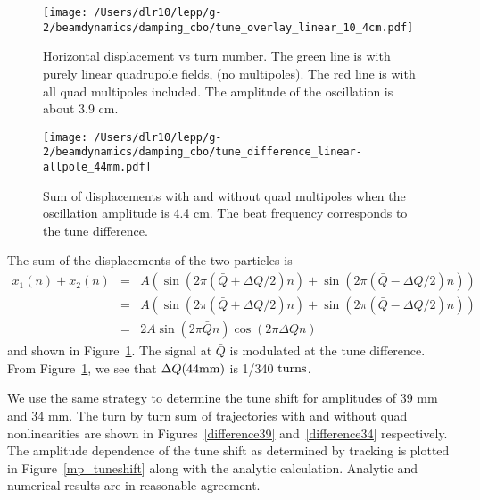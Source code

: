 \documentclass[10pt]{article}
\begin{document}
\begin{figure}[htbp] %
\begin{minipage}[t]{0.48\textwidth}
   \centering
   \texttt{[image: /Users/dlr10/lepp/g-2/beamdynamics/damping\_cbo/tune\_overlay\_linear\_10\_4cm.pdf]} 
   \caption{Horizontal displacement vs turn number. The green line is with purely linear quadrupole fields, (no multipoles). The red line
is with all quad multipoles included. The amplitude of the oscillation is about 3.9 cm. \label{overlay}}
 \end{minipage}
\hfill
\begin{minipage}[t]{0.48\textwidth}
\centering
   \texttt{[image: /Users/dlr10/lepp/g-2/beamdynamics/damping\_cbo/tune\_difference\_linear-allpole\_44mm.pdf]} 
\caption{Sum of displacements with and without quad multipoles when the oscillation amplitude is 4.4 cm. The beat frequency corresponds to the tune difference.
   \label{difference44}}
\end{minipage}
\end{figure}

The sum of the displacements of the two particles is
\begin{eqnarray*}
x_1(n)+x_2(n) &=& A\left(\sin(2\pi (\bar Q+\Delta Q/2) n)+\sin(2\pi(\bar Q-\Delta Q/2)n)\right)\\
&=& A\left(\sin(2\pi (\bar Q+\Delta Q/2) n)+\sin(2\pi(\bar Q-\Delta Q/2)n)\right)\\
&=& 2A\sin(2\pi \bar Q n)\cos(2\pi\Delta Q n)
\end{eqnarray*}
and shown in Figure~\ref{difference44}. The signal at $\bar Q$ is modulated at the tune difference.
From Figure~\ref{difference44}, we see that $\Delta Q (44{\rm mm})$ is 1/340 ${\rm turns}$.

We use the same strategy to determine the tune shift for amplitudes of 39 mm and 34 mm. The turn by turn sum
of trajectories with and without quad nonlinearities are shown in Figures~\ref{difference39} and~\ref{difference34} respectively.
The amplitude dependence of the tune shift as determined by tracking is plotted in Figure~\ref{mp_tuneshift} along with
the analytic calculation. Analytic and numerical results are in reasonable agreement. 
%
\end{document}
